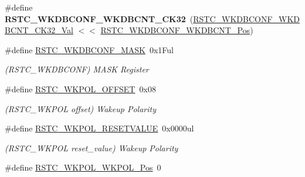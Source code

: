 \begin{DoxyCompactItemize}
\item 
\hypertarget{group___s_a_m_l21___r_s_t_c_gad17295879d0a8e9e41cce1d6d4f08720}{}\#define {\bfseries R\+S\+T\+C\+\_\+\+W\+K\+D\+B\+C\+O\+N\+F\+\_\+\+W\+K\+D\+B\+C\+N\+T\+\_\+C\+K32}~(\hyperlink{group___s_a_m_l21___r_s_t_c_gac25485898bfb56326d149c9287ebe9b6}{R\+S\+T\+C\+\_\+\+W\+K\+D\+B\+C\+O\+N\+F\+\_\+\+W\+K\+D\+B\+C\+N\+T\+\_\+C\+K32\+\_\+\+Val} $<$$<$ \hyperlink{group___s_a_m_l21___r_s_t_c_ga04802a267786aed951e1e31ab54ce6ad}{R\+S\+T\+C\+\_\+\+W\+K\+D\+B\+C\+O\+N\+F\+\_\+\+W\+K\+D\+B\+C\+N\+T\+\_\+\+Pos})\label{group___s_a_m_l21___r_s_t_c_gad17295879d0a8e9e41cce1d6d4f08720}

\item 
\hypertarget{group___s_a_m_l21___r_s_t_c_gaeea226bc992ff06e821cb603c99688e3}{}\#define \hyperlink{group___s_a_m_l21___r_s_t_c_gaeea226bc992ff06e821cb603c99688e3}{R\+S\+T\+C\+\_\+\+W\+K\+D\+B\+C\+O\+N\+F\+\_\+\+M\+A\+S\+K}~0x1\+Ful\label{group___s_a_m_l21___r_s_t_c_gaeea226bc992ff06e821cb603c99688e3}

\begin{DoxyCompactList}\small\item\em (R\+S\+T\+C\+\_\+\+W\+K\+D\+B\+C\+O\+N\+F) M\+A\+S\+K Register \end{DoxyCompactList}\item 
\hypertarget{group___s_a_m_l21___r_s_t_c_ga478e581a336453117ce19df9006ccf05}{}\#define \hyperlink{group___s_a_m_l21___r_s_t_c_ga478e581a336453117ce19df9006ccf05}{R\+S\+T\+C\+\_\+\+W\+K\+P\+O\+L\+\_\+\+O\+F\+F\+S\+E\+T}~0x08\label{group___s_a_m_l21___r_s_t_c_ga478e581a336453117ce19df9006ccf05}

\begin{DoxyCompactList}\small\item\em (R\+S\+T\+C\+\_\+\+W\+K\+P\+O\+L offset) Wakeup Polarity \end{DoxyCompactList}\item 
\hypertarget{group___s_a_m_l21___r_s_t_c_ga2cedaea418809c7fbae39a819d7ca95d}{}\#define \hyperlink{group___s_a_m_l21___r_s_t_c_ga2cedaea418809c7fbae39a819d7ca95d}{R\+S\+T\+C\+\_\+\+W\+K\+P\+O\+L\+\_\+\+R\+E\+S\+E\+T\+V\+A\+L\+U\+E}~0x0000ul\label{group___s_a_m_l21___r_s_t_c_ga2cedaea418809c7fbae39a819d7ca95d}

\begin{DoxyCompactList}\small\item\em (R\+S\+T\+C\+\_\+\+W\+K\+P\+O\+L reset\+\_\+value) Wakeup Polarity \end{DoxyCompactList}\item 
\hypertarget{group___s_a_m_l21___r_s_t_c_ga4559fc834c50f37469c9d9b5dd88dcdb}{}\#define \hyperlink{group___s_a_m_l21___r_s_t_c_ga4559fc834c50f37469c9d9b5dd88dcdb}{R\+S\+T\+C\+\_\+\+W\+K\+P\+O\+L\+\_\+\+W\+K\+P\+O\+L\+\_\+\+Pos}~0\label{group___s_a_m_l21___r_s_t_c_ga4559fc834c50f37469c9d9b5dd88dcdb}


\end{DoxyCompactItemize}
